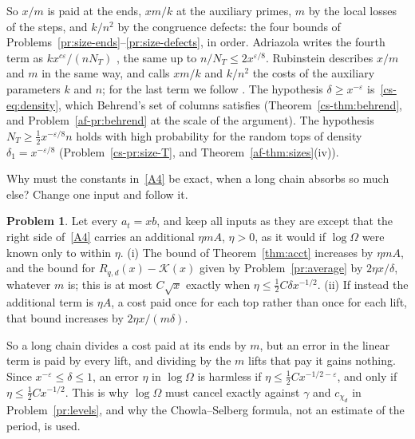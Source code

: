 \documentclass[reqno]{amsart}
\theoremstyle{definition}
\newtheorem{problem}{Problem}[section]
\theoremstyle{plain}
\begin{document}
So \(x/m\) is paid at the ends, \(xm/k\) at the auxiliary primes, \(m\) by the local losses of the steps, and \(k/n^2\) by the congruence defects: the four bounds of Problems~\ref{pr:size-ends}--\ref{pr:size-defects}, in order.  Adriazola writes the fourth term as \(kx^{c\varepsilon}/(nN_T)\) \cite[\S4.3]{Adr}, the same up to \(n/N_T \le 2x^{\varepsilon/8}\).  Rubinstein \cite[\S I.8]{Rub} describes \(x/m\) and \(m\) in the same way, and calls \(xm/k\) and \(k/n^2\) the costs of the auxiliary parameters \(k\) and \(n\); for the last term we follow \cite[\S\S16--18]{Adr}.  The hypothesis \(\delta \ge x^{-\varepsilon}\) is~\eqref{cs-eq:density}, which Behrend's set of columns satisfies (Theorem~\ref{cs-thm:behrend}, and Problem~\ref{af-pr:behrend} at the scale of the argument).  The hypothesis \(N_T \ge \frac12 x^{-\varepsilon/8}n\) holds with high probability for the random tops of density \(\delta_1 = x^{-\varepsilon/8}\) (Problem~\ref{cs-pr:size-T}, and Theorem~\ref{af-thm:sizes}(iv)).

Why must the constants in~\eqref{A4} be exact, when a long chain absorbs so much else?  Change one input and follow it.

\begin{problem}\label{pr:eta-error}
Let every \(a_t = xb\), and keep all inputs as they are except that the right side of~\eqref{A4} carries an additional \(\eta mA\), \(\eta > 0\), as it would if \(\log\Omega\) were known only to within \(\eta\).  (i) The bound of Theorem~\ref{thm:acct} increases by \(\eta mA\), and the bound for \(R_{q,d}(x) - \mathcal{K}(x)\) given by Problem~\ref{pr:average} by \(2\eta x/\delta\), whatever \(m\) is; this is at most \(C\sqrt x\) exactly when \(\eta \le \frac12 C\delta x^{-1/2}\).  (ii) If instead the additional term is \(\eta A\), a cost paid once for each top rather than once for each lift, that bound increases by \(2\eta x/(m\delta)\).
\end{problem}

So a long chain divides a cost paid at its ends by \(m\), but an error in the linear term is paid by every lift, and dividing by the \(m\) lifts that pay it gains nothing.  Since \(x^{-\varepsilon} \le \delta \le 1\), an error \(\eta\) in \(\log\Omega\) is harmless if \(\eta \le \frac12 Cx^{-1/2-\varepsilon}\), and only if \(\eta \le \frac12 Cx^{-1/2}\).  This is why \(\log\Omega\) must cancel exactly against \(\gamma\) and \(c_{\chi_d}\) in Problem~\ref{pr:levels}, and why the Chowla--Selberg formula, not an estimate of the period, is used.
\end{document}
